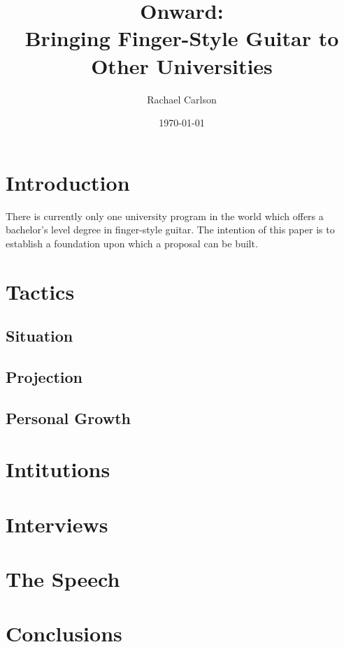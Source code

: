 \documentclass[12pt]{article}
\title{Onward: \\ Bringing Finger-Style Guitar to Other Universities}
\author{Rachael Carlson}
\date{\today}
\begin{document}
\maketitle        
\tableofcontents

\section{Introduction}
\label{sec:introduction}
There is currently only one university program in the world which offers a
bachelor's level degree in finger-style guitar. The intention of this paper is to establish a foundation upon which a proposal
can be built. 



\section{Tactics}

\label{sec:tactics}

\subsection{Situation}
\label{sec:situation}

\subsection{Projection}
\label{sec:projection}

\subsection{Personal Growth}
\label{sec:personal-growth}

\section{Intitutions}
\label{sec:intitutions}

\section{Interviews}
\label{sec:interviews}

\section{The Speech}
\label{sec:speech}

\section{Conclusions}
\label{sec:conclusions}
\end{document}
